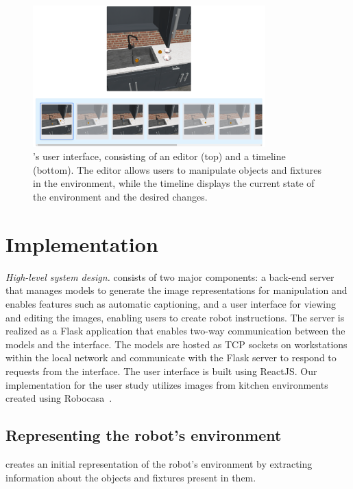 \begin{figure}[htbp]
\centerline{\includegraphics[width=0.8\textwidth]{figures/Interface.png}}
\caption{\projname's user interface, consisting of an editor (top) and a timeline (bottom). The editor allows users to manipulate objects and fixtures in the environment, while the timeline displays the current state of the environment and the desired changes.}
\label{fig:interface}
\end{figure}

\section{Implementation}
\noindent \emph{High-level system design.} \projname consists of two major components: a back-end server that manages models to generate the image representations for manipulation and enables features such as automatic captioning, and a user interface for viewing and editing the images, enabling users to create robot instructions. The server is realized as a Flask application that enables two-way communication between the models and the interface. The models are hosted as TCP sockets on workstations within the local network and communicate with the Flask server to respond to requests from the interface. The user interface is built using ReactJS. Our implementation for the user study utilizes images from kitchen environments created using Robocasa~\cite{nasiriany2024robocasa}. 


\subsection{Representing the robot's environment} 
\projname creates an initial representation of the robot's environment by extracting information about the objects and fixtures present in them. 

